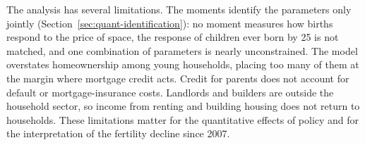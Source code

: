 The analysis has several limitations. The moments identify the parameters only
jointly (Section~\ref{sec:quant-identification}): no moment measures how
births respond to the price of space, the response of children ever born by 25
is not matched, and one combination of parameters is nearly unconstrained.
The model overstates homeownership among young households, placing too many
of them at the margin where mortgage credit acts. Credit for parents does
not account for default or mortgage-insurance costs. Landlords and builders
are outside the household sector, so income from renting and building housing
does not return to households. These limitations matter for the quantitative
effects of policy and for the interpretation of the fertility decline since
2007.
